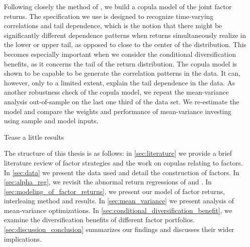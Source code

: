 Following closely the method of \textcite{ChristoffersenLanglois2013}, we build a copula model of the joint factor returns. The specification we use is designed to recognize time-varying correlations and tail dependence, which is the notion that there might be significantly different dependence patterns when returns simultaneously realize in the lower or upper tail, as opposed to close to the center of the distribution. This becomes especially important when we consider the conditional diversification benefits, as it concerns the tail of the return distribution. The copula model is shown to be capable to be generate the correlation patterns in the data. It can, however, only to a limited extent, explain the tail dependence in the data. As another robustness check of the copula model, we repeat the mean-variance analysis out-of-sample on the last one third of the data set. We re-estimate the model and compare the weights and performance of mean-variance investing using sample and model inputs.

Tease a little results
 
The structure of this thesis is as follows: in \autoref{sec:literature} we provide a brief literature review of factor strategies and the work on copulas relating to factors. In \autoref{sec:data} we present the data used and detail the construction of factors. In \autoref{sec:alpha_reg}, we revisit the abnormal return regressions of \textcite{FF2015} and \textcite{Asness2015}. In \autoref{sec:modeling_of_factor_returns}, we present our model of factor returns, interleaing method and results. In \autoref{sec:mean_variance} we present analysis of mean-variance optimizations. In \autoref{sec:conditional_diversification_benefit}, we examine the diversification benefits of different factor portfolios. \autoref{sec:discussion_conclusion} summarizes our findings and discusses their wider implications.
